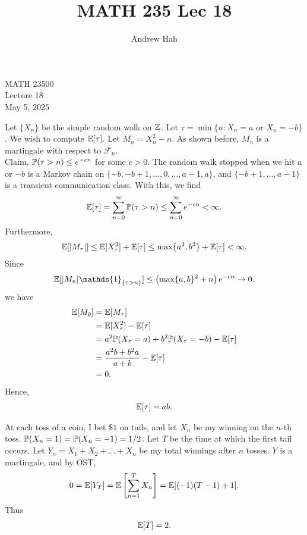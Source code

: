 \documentclass[11pt]{article}
\title{MATH 235 Lec 18}
\author{Andrew Hah}
\begin{document}
\pagestyle{plain}
\begin{center}
{\Large MATH 23500} \\
{\Large Lecture 18} \\
\vspace{.2in}
May 5, 2025
\end{center}

\begin{example} Let $\{ X_n \}$ be the simple random walk on $\mathbb{Z}$. Let $\tau = \min \{ n : X_n = a \text{ or } X_n = -b \}$. We wish to compute $\mathbb{E} [\tau ]$. Let $M_n = X_n^2 - n$. As shown before, $M_n$ is a martingale with respect to $\mathcal{F}_n$. \\

  Claim. $\mathbb{P} (\tau > n) \le e^{-cn}$ for some $c > 0$. The random walk stopped when we hit $a$ or $-b$ is a Markov chain on $\{ -b, -b + 1, \dots, 0, \dots, a - 1, a \}$, and $\{ -b + 1, \dots, a - 1 \}$ is a transient communication class. With this, we find \begin{align*} \mathbb{E} [\tau ] = \sum_{n = 0}^{\infty} \mathbb{P} (\tau > n ) \le \sum_{n = 0}^{\infty} e^{-cn} < \infty. \end{align*} Furthermore, \begin{align*} \mathbb{E} [ |M_{\tau} |] \le \mathbb{E} [ X_{\tau}^2] + \mathbb{E} [\tau] \le \max \{ a^2, b^2 \} + \mathbb{E} [\tau] < \infty. \end{align*} Since \begin{align*} \bbE [|M_n | \mathds{1}_{\{ \tau > n \}}] \le \left( \max \{ a, b \}^2 + n \right) e^{-cn} \to 0. \end{align*} we have \begin{align*} \mathbb{E} [M_0] & = \mathbb{E} [M_{\tau}] \\ & = \mathbb{E} [X_{\tau}^2] - \mathbb{E}[\tau] \\ & = a^2 \mathbb{P} (X_{\tau} = a) + b^2 \mathbb{P} (X_{\tau} = -b) - \mathbb{E} [\tau] \\ & = \frac{a^2b + b^2 a}{a + b} - \mathbb{E}[\tau] \\ & = 0. \end{align*} Hence, \begin{align*} \mathbb{E} [\tau] = ab. \end{align*}
\end{example}

\begin{example} At each toss of a coin, I bet $\$ 1$ on tails, and let $X_n$ be my winning on the $n$-th toss. $\mathbb{P} (X_n = 1) = \mathbb{P}(X_n = -1) = 1/2$. Let $T$ be the time at which the first tail occurs. Let $Y_n = X_1 + X_2 + \dots + X_n$ be my total winnings after $n$ tosses. $Y$ is a martingale, and by OST, \begin{align*} 0 = \mathbb{E} [Y_T] = \mathbb{E} \left[ \sum_{n = 1}^T X_n \right] = \mathbb{E} [(-1)(T - 1) + 1]. \end{align*} Thus \begin{align*} \mathbb{E} [T] = 2. \end{align*}
\end{example}
\end{document}
